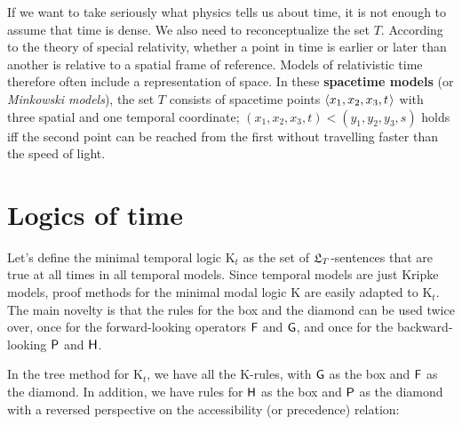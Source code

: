 If we want to take seriously what physics tells us about time, it is not enough
to assume that time is dense. We also need to reconceptualize the set $T$.
According to the theory of special relativity, whether a point in time is
earlier or later than another is relative to a spatial frame of reference. Models of relativistic time therefore often include a representation of
space. In these \textbf{spacetime models} (or \emph{Minkowski models}), the set
$T$ consists of spacetime points $\t{x_1,x_2,x_3,t}$ with three spatial and one
temporal coordinate; $(x_1,x_2,x_3,t) < (y_1,y_2,y_3,s)$ holds iff the second
point can be reached from the first without travelling faster than the speed of
light.

\section{Logics of time}

Let's define the minimal temporal logic K$_t$ as the set of $\mathfrak{L}_{T}$-sentences
that are true at all times in all temporal models. Since temporal models are
just Kripke models, proof methods for the minimal modal logic K are easily
adapted to K$_{t}$. The main novelty is that the rules for the box and the
diamond can be used twice over, once for the forward-looking operators $\operatorname{\mathsf{F}}$ and
$\operatorname{\mathsf{G}}$, and once for the backward-looking $\operatorname{\mathsf{P}}$ and $\operatorname{\mathsf{H}}$.

In the tree method for K$_{t}$, we have all the K-rules, with $\operatorname{\mathsf{G}}$ as the box
and $\operatorname{\mathsf{F}}$ as the diamond. In addition, we have rules for $\operatorname{\mathsf{H}}$ as the box and
$\operatorname{\mathsf{P}}$ as the diamond with a reversed perspective on the accessibility (or
precedence) relation:

